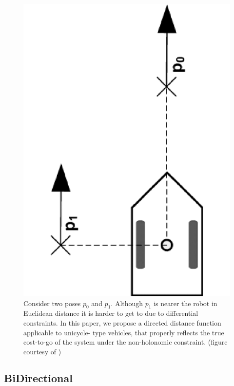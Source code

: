 \begin{figure}
  \centering
  \includegraphics[scale=.2,angle=-90]{figures/rrtfunnel/non-holonomic-vehicle-euclidean-weakness}
  \caption{Consider two poses \(p_0\) and \(p_1\). Although \(p_1\) is nearer
    the robot in Euclidean distance it is harder to get to due to differential
    constraints. In this paper, we propose a directed distance function
    applicable to unicycle- type vehicles, that properly reflects the true
    cost-to-go of the system under the non-holonomic constraint. (figure
    courtesy of \cite{parkFeedbackMotionPlanning2015})}
  \label{fig:non-holonomic-vehicle-euclidean-weakness}
\end{figure}

\subsection{BiDirectional}

